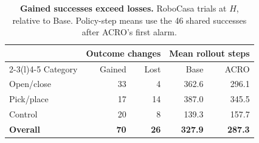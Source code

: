 \begin{table}
\vspace{-4pt}
\captionsetup{justification=raggedright,singlelinecheck=false}
\centering
\small
\setlength{\tabcolsep}{4.5pt}
\caption{\textbf{Gained successes exceed losses.} RoboCasa trials at $H$, relative to Base. Policy-step means use the 46 shared successes after ACRO's first alarm.}
\label{tab:recovery-summary}
\begin{tabular}{@{}lrrrr@{}}
\toprule
 & \multicolumn{2}{c}{Outcome changes} & \multicolumn{2}{c}{Mean rollout steps} \\
\cmidrule(lr){2-3}\cmidrule(l){4-5}
Category & Gained & Lost & Base & ACRO \\
\midrule
Open/close & 33 & 4 & 362.6 & 296.1 \\
Pick/place & 17 & 14 & 387.0 & 345.5 \\
Control & 20 & 8 & 139.3 & 157.7 \\
\midrule
\textbf{Overall} & \textbf{70} & \textbf{26} & \textbf{327.9} & \textbf{287.3} \\
\bottomrule
\end{tabular}
\end{table}
